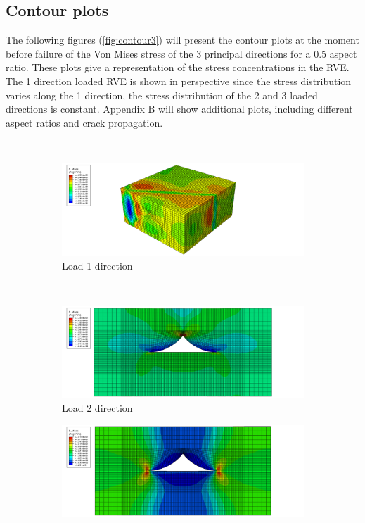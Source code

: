 \subsection{Contour plots }
The following figures (\ref{fig:contour3}) will present the contour plots at the moment before failure of the Von Mises stress of the 3 principal directions for a 0.5 aspect ratio. These plots give a representation of the stress concentrations in the RVE. The 1 direction loaded RVE is shown in perspective since the stress distribution varies along the 1 direction, the stress distribution of the 2 and 3 loaded directions is constant. Appendix B will show additional plots, including different aspect ratios and crack propagation. 

\begin{figure}
\centering
\\
  \begin{subfigure}[b]{0.8\textwidth}
    \includegraphics[width=\textwidth]{chapter_7_non-elasticmodelling/figures/p1_05.png}
    \caption{Load 1 direction}
  \end{subfigure}
  \\
    \begin{subfigure}[b]{0.5\textwidth}
    \includegraphics[width=\textwidth]{chapter_7_non-elasticmodelling/figures/p2_05.png}
    \caption{Load 2 direction}
  \end{subfigure}
    \begin{subfigure}[b]{0.5\textwidth}
    \includegraphics[width=\textwidth]{chapter_7_non-elasticmodelling/figures/p3_05.png}

\end{subfigure}
\end{figure}
